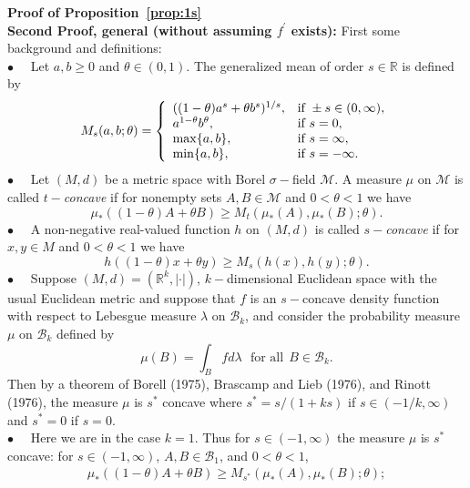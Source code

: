 \documentclass[11pt]{amsart}
\numberwithin{equation}{section}
\newcommand{\RR}{\mathbb{R}}
\theoremstyle{definition}\newtheorem{definition}{Definition}
\theoremstyle{remark}\newtheorem{assumption}{Assumption}
\theoremstyle{remark}\newtheorem{remark}{Remark}
\theoremstyle{definition}\newtheorem{example}{Example}
\theoremstyle{plain}\newtheorem{question}{Question}
\theoremstyle{plain}\newtheorem{theorem}{Theorem}
\theoremstyle{plain}\newtheorem{lemma}{Lemma}
\theoremstyle{plain}\newtheorem{proposition}{Proposition}
\theoremstyle{plain}\newtheorem{corollary}{Corollary}
\theoremstyle{plain}\newtheorem{conjecture}{Conjecture}
\begin{document}
\par\noindent
{\bf Proof of Proposition~\ref{prop:1s}} \\
{\bf Second Proof, general (without assuming $f^{\prime}$ exists):} 
First some background and definitions:\\
$\bullet$ \ \ Let $a,b \ge 0$ and $\theta \in (0,1)$.  
The generalized mean of order $s \in \RR$ is defined by 
\begin{eqnarray*}
M_s (a,b; \theta) 
= \left \{ \begin{array}{l l} ((1-\theta)a^s + \theta b^s )^{1/s},  &  \mbox{if} \ \pm s \in (0,\infty), \\
                                         a^{1-\theta} b^{\theta} , & \mbox{if} \ s = 0,\\
                                         \max\{ a,b \} , & \mbox{if} \ s = \infty, \\
                                         \min\{ a,b \} , & \mbox{if} \ s = - \infty .
              \end{array}
\right .
\end{eqnarray*}
$\bullet$  \ \ Let $(M,d)$ be a metric space with Borel $\sigma-$field $\mathcal{M}$.  
A measure $\mu$ on $\mathcal{M}$ is called {\sl $t-$concave} if for nonempty sets $A,B \in \mathcal{M}$ and $0 < \theta < 1$ we 
have 
$$
\mu_{*} ((1-\theta ) A + \theta B) \ge M_t ( \mu_{*} (A), \mu_{*} (B) ; \theta ) .
$$
$\bullet $ \ \ A non-negative real-valued function $h$ on $(M,d)$ is called {\sl $s-$concave} if for $x,y \in M$ and $0 < \theta <1$ 
we have 
$$
h((1-\theta)x + \theta y) \ge M_s ( h(x), h(y) ; \theta ).
$$
$\bullet$ \ \ Suppose $(M, d) = ( \RR^k, | \cdot | )$, $k-$dimensional Euclidean space with the usual Euclidean metric 
and suppose that $f$ is an $s-$concave density function with respect to Lebesgue measure $\lambda $ on $\mathcal{B}_k$, 
and consider the probability measure $\mu$ on $\mathcal{B}_k$ defined by 
$$
\mu (B) = \int_B f d \lambda  \ \ \ \mbox{for all} \ \ B \in \mathcal{B}_k .
$$
Then by a theorem of Borell (1975), Brascamp and Lieb (1976), and Rinott (1976),
the measure $\mu$ is $s^*$ concave where $s^* = s/(1+ks)$ if $s \in (-1/k,\infty)$ and $s^* = 0$ if $s= 0$.\\
$\bullet$ \ \ Here we are in the case $k=1$.    Thus for $s \in (-1,\infty)$ the measure $\mu$ 
is $s^*$ concave:  for $s \in (-1,\infty)$, $A, B \in \mathcal{B}_1$, and $0 < \theta < 1$,
\begin{eqnarray}
\mu_{*} ( (1-\theta )A + \theta B) \ge M_{s^*} ( \mu_{*} (A) , \mu_{*} (B) ; \theta ) ;
\label{GeneralS-concaveMeasInequalityForR}
\end{eqnarray}
\end{document}
